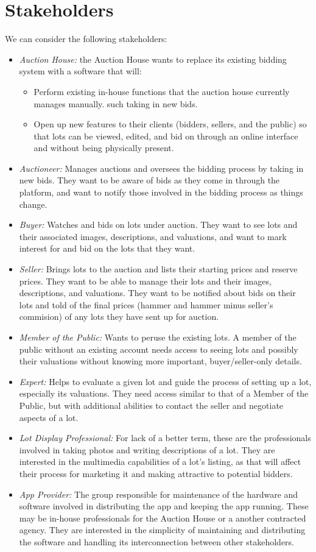 \documentclass[titlepage, 12pt]{extarticle}
\begin{document}
\section{Stakeholders}
We can consider the following stakeholders:
\begin{itemize}
\item {\it Auction House:} the Auction House wants to replace its existing bidding system with a software that will:
  \begin{itemize}
  \item Perform existing in-house functions that the auction house currently manages manually. such taking in new bids.
  \item Open up new features to their clients (bidders, sellers, and the public) so that lots can be viewed, edited, and bid on through an online interface and without being physically present.
  \end{itemize}
\item {\it Auctioneer:} Manages auctions and oversees the bidding process by taking in new bids. They want to be aware of bids as they come in through the platform, and want to notify those involved in the bidding process as things change.
\item {\it Buyer:} Watches and bids on lots under auction. They want to see lots and their associated images, descriptions, and valuations, and want to mark interest for and bid on the lots that they want.
\item {\it Seller:} Brings lots to the auction and lists their starting prices and reserve prices. They want to be able to manage their lots and their images, descriptions, and valuations. They want to be notified about bids on their lots and told of the final prices (hammer and hammer minus seller's commision) of any lots they have sent up for auction.
\item {\it Member of the Public:} Wants to peruse the existing lots. A member of the public without an existing account needs access to seeing lots and possibly their valuations without knowing more important, buyer/seller-only details.
\item {\it Expert:} Helps to evaluate a given lot and guide the process of setting up a lot, especially its valuations. They need access similar to that of a Member of the Public, but with additional abilities to contact the seller and negotiate aspects of a lot.
\item {\it Lot Display Professional:} For lack of a better term, these are the professionals involved in taking photos and writing descriptions of a lot. They are interested in the multimedia capabilities of a lot's listing, as that will affect their process for marketing it and making attractive to potential bidders.
\item {\it App Provider:} The group responsible for maintenance of the hardware and software involved in distributing the app and keeping the app running. These may be in-house professionals for the Auction House or a another contracted agency. They are interested in the simplicity of maintaining and distributing the software and handling its interconnection between other stakeholders.
\end{itemize}
\end{document}
